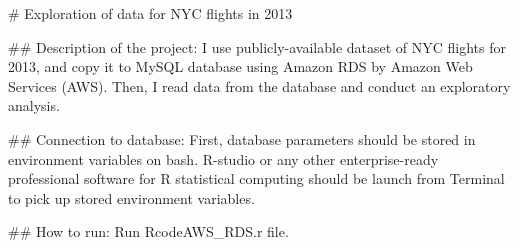 # Exploration of data for NYC flights in 2013 

## Description of the project:
I use publicly-available dataset of NYC flights for 2013, and copy it to MySQL database using Amazon RDS by Amazon Web Services (AWS). Then, I read data from the database and conduct an exploratory analysis. 

## Connection to database:
First, database parameters should be stored in environment variables on bash.
R-studio or any other enterprise-ready professional software for R statistical computing should be launch from Terminal to pick up stored environment variables. 

## How to run:
Run RcodeAWS_RDS.r file.


